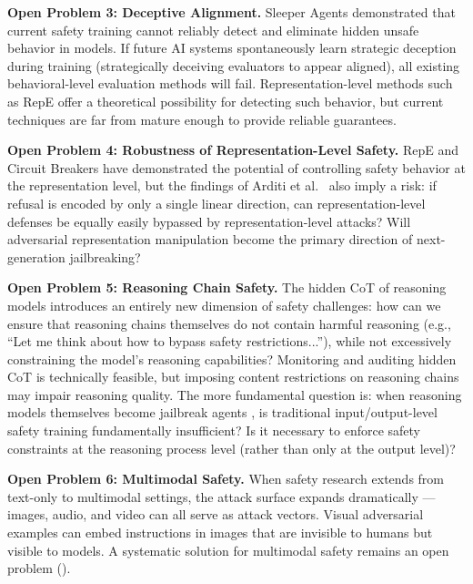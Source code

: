 \begin{openproblembox}
\textbf{Open Problem 3: Deceptive Alignment.}
Sleeper Agents \cite{hubinger2024sleeper} demonstrated that current safety training
cannot reliably detect and eliminate hidden unsafe behavior in models.
If future AI systems spontaneously learn strategic deception during training
(strategically deceiving evaluators to appear aligned),
all existing behavioral-level evaluation methods will fail.
Representation-level methods such as RepE offer a theoretical possibility for detecting such behavior,
but current techniques are far from mature enough to provide reliable guarantees.
\end{openproblembox}

\begin{openproblembox}
\textbf{Open Problem 4: Robustness of Representation-Level Safety.}
RepE and Circuit Breakers have demonstrated the potential of controlling safety behavior at the representation level,
but the findings of Arditi et al.\ \cite{arditi2024refusal} also imply a risk:
if refusal is encoded by only a single linear direction,
can representation-level defenses be equally easily bypassed by representation-level attacks?
Will adversarial representation manipulation
become the primary direction of next-generation jailbreaking?
\end{openproblembox}

\begin{openproblembox}
\textbf{Open Problem 5: Reasoning Chain Safety.}
The hidden CoT of reasoning models introduces an entirely new dimension of safety challenges:
how can we ensure that reasoning chains themselves do not contain harmful reasoning
(e.g., ``Let me think about how to bypass safety restrictions...''),
while not excessively constraining the model's reasoning capabilities?
Monitoring and auditing hidden CoT is technically feasible,
but imposing content restrictions on reasoning chains may impair reasoning quality.
The more fundamental question is: when reasoning models themselves become jailbreak agents
\cite{hagendorff2026jailbreakagents},
is traditional input/output-level safety training fundamentally insufficient?
Is it necessary to enforce safety constraints at the reasoning process level (rather than only at the output level)?
\end{openproblembox}

\begin{openproblembox}
\textbf{Open Problem 6: Multimodal Safety.}
When safety research extends from text-only to multimodal settings,
the attack surface expands dramatically --- images, audio, and video can all serve as attack vectors.
Visual adversarial examples can embed instructions in images that are invisible to humans but visible to models.
A systematic solution for multimodal safety remains an open problem
().
\end{openproblembox}


